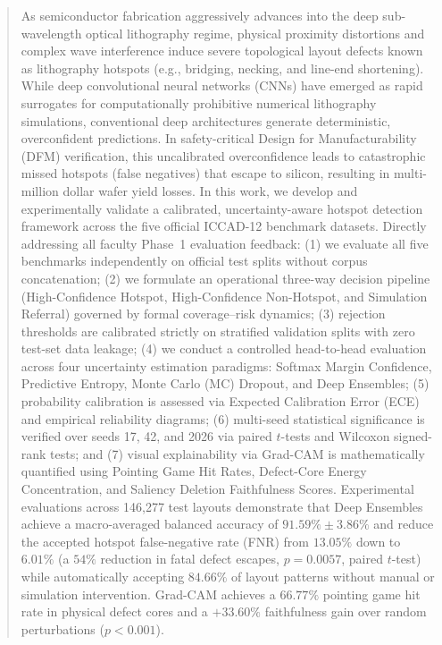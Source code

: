 \documentclass[11pt,journal,onecolumn]{IEEEtran}
\begin{document}
\begin{abstract}
As semiconductor fabrication aggressively advances into the deep sub-wavelength optical lithography regime, physical proximity distortions and complex wave interference induce severe topological layout defects known as lithography hotspots (e.g., bridging, necking, and line-end shortening). While deep convolutional neural networks (CNNs) have emerged as rapid surrogates for computationally prohibitive numerical lithography simulations, conventional deep architectures generate deterministic, overconfident predictions. In safety-critical Design for Manufacturability (DFM) verification, this uncalibrated overconfidence leads to catastrophic missed hotspots (false negatives) that escape to silicon, resulting in multi-million dollar wafer yield losses.
In this work, we develop and experimentally validate a calibrated, uncertainty-aware hotspot detection framework across the five official ICCAD-12 benchmark datasets. Directly addressing all faculty Phase~1 evaluation feedback: (1) we evaluate all five benchmarks independently on official test splits without corpus concatenation; (2) we formulate an operational three-way decision pipeline (High-Confidence Hotspot, High-Confidence Non-Hotspot, and Simulation Referral) governed by formal coverage--risk dynamics; (3) rejection thresholds are calibrated strictly on stratified validation splits with zero test-set data leakage; (4) we conduct a controlled head-to-head evaluation across four uncertainty estimation paradigms: Softmax Margin Confidence, Predictive Entropy, Monte Carlo (MC) Dropout, and Deep Ensembles; (5) probability calibration is assessed via Expected Calibration Error (ECE) and empirical reliability diagrams; (6) multi-seed statistical significance is verified over seeds 17, 42, and 2026 via paired $t$-tests and Wilcoxon signed-rank tests; and (7) visual explainability via Grad-CAM is mathematically quantified using Pointing Game Hit Rates, Defect-Core Energy Concentration, and Saliency Deletion Faithfulness Scores.
Experimental evaluations across 146,277 test layouts demonstrate that Deep Ensembles achieve a macro-averaged balanced accuracy of $91.59\% \pm 3.86\%$ and reduce the accepted hotspot false-negative rate (FNR) from $13.05\%$ down to $6.01\%$ (a $54\%$ reduction in fatal defect escapes, $p = 0.0057$, paired $t$-test) while automatically accepting $84.66\%$ of layout patterns without manual or simulation intervention. Grad-CAM achieves a $66.77\%$ pointing game hit rate in physical defect cores and a $+33.60\%$ faithfulness gain over random perturbations ($p < 0.001$).
\end{abstract}
\end{document}
